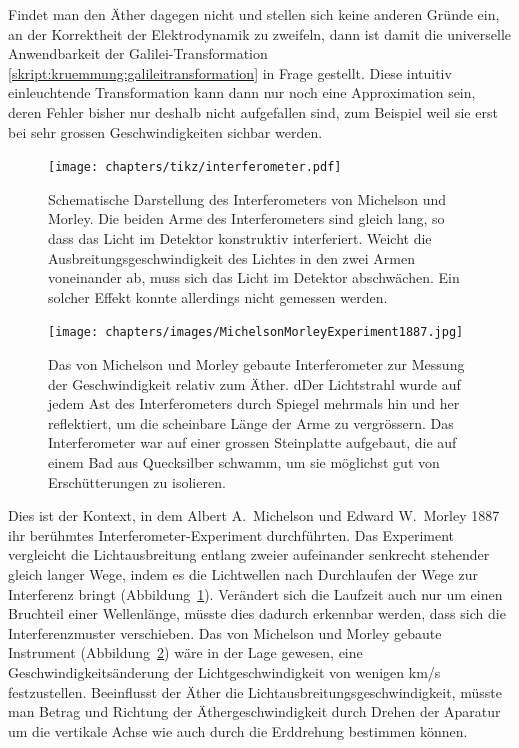 Findet man den Äther dagegen nicht und stellen sich keine anderen Gründe
ein, an der Korrektheit der Elektrodynamik zu zweifeln, dann ist damit
die universelle Anwendbarkeit der Galilei-Transformation 
\eqref{skript:kruemmung:galileitransformation} in Frage gestellt.
Diese intuitiv einleuchtende Transformation kann dann nur noch eine
Approximation sein, deren Fehler bisher nur deshalb nicht aufgefallen
sind, zum Beispiel weil sie erst bei sehr grossen Geschwindigkeiten
sichbar werden.

\begin{figure}
\centering
\texttt{[image: chapters/tikz/interferometer.pdf]}
\caption{Schematische Darstellung des Interferometers von Michelson und Morley.
Die beiden Arme des Interferometers sind gleich lang, so dass das Licht
im Detektor konstruktiv interferiert.
Weicht die Ausbreitungsgeschwindigkeit des Lichtes in den zwei Armen
voneinander ab, muss sich das Licht im Detektor abschwächen.
Ein solcher Effekt konnte allerdings nicht gemessen werden.
\label{skript:speziell:interferometerprinzip}}
\end{figure}

\begin{figure}
\centering
\texttt{[image: chapters/images/MichelsonMorleyExperiment1887.jpg]}
\caption{Das von Michelson und Morley gebaute Interferometer zur Messung
der Geschwindigkeit relativ zum Äther.
dDer Lichtstrahl wurde auf jedem Ast des Interferometers durch Spiegel
mehrmals hin und her reflektiert, um die scheinbare Länge der Arme
zu vergrössern.
Das Interferometer war auf einer grossen Steinplatte aufgebaut, die auf einem
Bad aus Quecksilber schwamm, um sie möglichst gut von Erschütterungen zu
isolieren.
\label{MMinterferometer}}
\end{figure}
Dies ist der Kontext, in dem Albert A.~Michelson und Edward W.~Morley
1887
%
%
%
%
ihr berühmtes Interfero\-meter-Experiment durchführten.
Das Experiment vergleicht die Lichtausbreitung entlang zweier aufeinander
senkrecht stehender gleich langer Wege, indem es die Lichtwellen nach 
Durchlaufen der Wege zur Interferenz bringt
(Abbildung~\ref{skript:speziell:interferometerprinzip}).
Verändert sich die Laufzeit auch nur um einen Bruchteil einer Wellenlänge,
müsste dies dadurch erkennbar werden, dass sich die Interferenzmuster
verschieben.
Das von Michelson und Morley gebaute Instrument
(Abbildung~\ref{MMinterferometer}) wäre in der Lage
gewesen, eine Geschwindigkeitsänderung der Lichtgeschwindigkeit von
wenigen km/s festzustellen.
Beeinflusst der Äther die Lichtausbreitungsgeschwindigkeit, müsste 
man Betrag und Richtung der Äthergeschwindigkeit durch Drehen der
Aparatur um die vertikale Achse wie auch durch die Erddrehung
bestimmen können.

